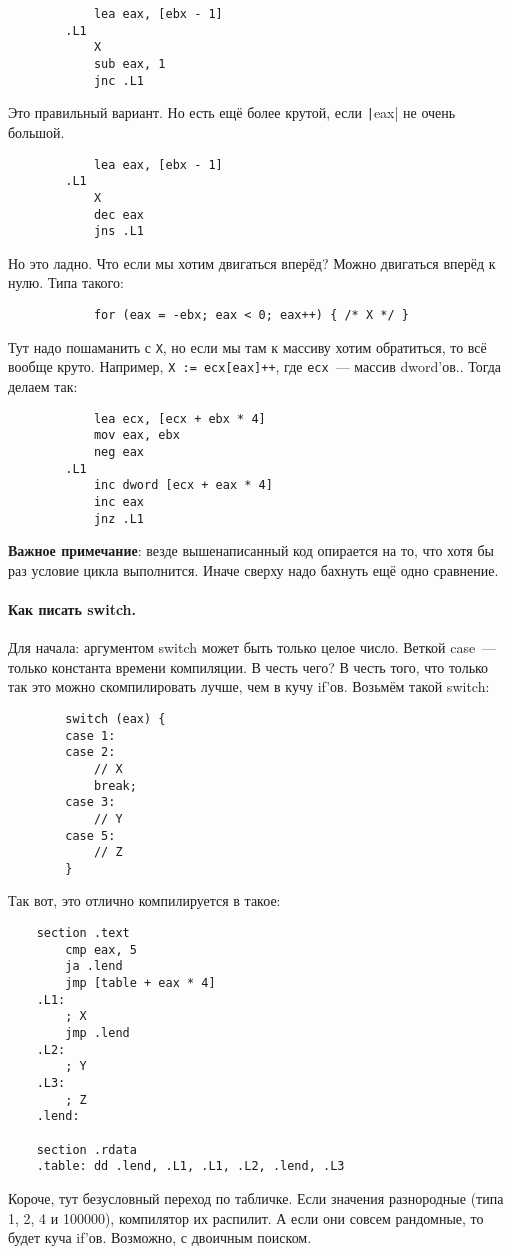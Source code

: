 \documentclass{article}
\begin{document}
\begin{itemize}
\begin{verbatim}
            lea eax, [ebx - 1]
        .L1
            X
            sub eax, 1
            jnc .L1
        \end{verbatim}
        Это правильный вариант. Но есть ещё более крутой, если \texttt|eax| не очень большой.
        \begin{verbatim}
            lea eax, [ebx - 1]
        .L1
            X
            dec eax
            jns .L1
        \end{verbatim}
        Но это ладно. Что если мы хотим двигаться вперёд? Можно двигаться вперёд к нулю. Типа такого:
        \begin{verbatim}
            for (eax = -ebx; eax < 0; eax++) { /* X */ }
        \end{verbatim}
        Тут надо пошаманить с \Verb|X|, но если мы там к массиву хотим обратиться, то всё вообще круто. Например, \Verb|X := ecx[eax]++|, где \Verb|ecx|~--- массив dword'ов.. Тогда делаем так:
        \begin{verbatim}
            lea ecx, [ecx + ebx * 4]
            mov eax, ebx
            neg eax
        .L1
            inc dword [ecx + eax * 4]
            inc eax
            jnz .L1
        \end{verbatim}
        \textbf{Важное примечание}: везде вышенаписанный код опирается на то, что хотя бы раз условие цикла выполнится. Иначе сверху надо бахнуть ещё одно сравнение.
    \end{itemize}
    \paragraph{Как писать switch.}
    Для начала: аргументом switch может быть только целое число. Веткой case~--- только константа времени компиляции. В честь чего? В честь того, что только так это можно скомпилировать лучше, чем в кучу if'ов. Возьмём такой switch:
    \begin{verbatim}
        switch (eax) {
        case 1:
        case 2:
            // X
            break;
        case 3:
            // Y
        case 5:
            // Z
        }
    \end{verbatim}
    Так вот, это отлично компилируется в такое:
    \begin{verbatim}
    section .text
        cmp eax, 5
        ja .lend
        jmp [table + eax * 4]
    .L1:
        ; X
        jmp .lend
    .L2:
        ; Y
    .L3:
        ; Z
    .lend:

    section .rdata
    .table: dd .lend, .L1, .L1, .L2, .lend, .L3
    \end{verbatim}
    Короче, тут безусловный переход по табличке. Если значения разнородные (типа 1, 2, 4 и 100000), компилятор их распилит. А если они совсем рандомные, то будет куча if'ов. Возможно, с двоичным поиском.
\end{document}

